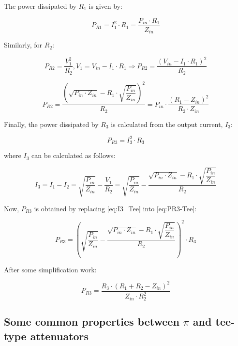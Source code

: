 \noindent The power dissipated by $R_{1}$ is given by:

\begin{equation}
P_{R1} = I_{1}^2 \cdot R_{1} = \dfrac{P_{in} \cdot R_{1}}{Z_{in}}
\end{equation}

\noindent Similarly, for $R_{2}$:

\begin{equation}
P_{R2} = \dfrac{V_{1}^2}{R_{2}}, V_{1} = V_{in} - I_{1} \cdot R_{1} \Rightarrow P_{R2} = \dfrac{(V_{in} - I_{1}\cdot R_{1})^2}{R_{2}}
\end{equation}

\begin{equation}
P_{R2} = \dfrac{\left( \sqrt{P_{in} \cdot Z_{in}} - R_{1}\cdot \sqrt{\dfrac{P_{in}}{Z_{in}}}\right)^2}{R_2} = P_{in} \cdot \dfrac{(R_{1}-Z_{in})^2}{R_{2} \cdot Z_{in}}
\end{equation}

\noindent Finally, the power dissipated by $R_{3}$ is calculated from the output current, $I_3$:

\begin{equation}
P_{R3} = I_{3}^2 \cdot R_{3}
\label{eq:PR3-Tee}
\end{equation}

\noindent where $I_{3}$ can be calculated as follows:

\begin{equation}
I_3 = I_1 - I_2 = \sqrt{\dfrac{P_{in}}{Z_{in}}} - \dfrac{V_{1}}{R_{2}} = \sqrt{\dfrac{P_{in}}{Z_{in}}} - \dfrac{\sqrt{P_{in} \cdot Z_{in}} - R_{1} \cdot \sqrt{\dfrac{P_{in}}{Z_{in}}}}{R_{2}}
\label{eq:I3_Tee}
\end{equation}

\noindent Now, $P_{R3}$ is obtained by replacing \ref{eq:I3_Tee} into \ref{eq:PR3-Tee}:

\begin{equation}
P_{R3} = \left( \sqrt{\dfrac{P_{in}}{Z_{in}}} - \dfrac{\sqrt{P_{in} \cdot Z_{in}} - R_{1} \cdot \sqrt{\dfrac{P_{in}}{Z_{in}}}}{R_{2}} \right)^2 \cdot R_{3}
\end{equation}

\noindent After some simplification work:

\begin{equation}
P_{R3} = \dfrac{R_3 \cdot (R_1 + R_2 - Z_{in})^2}{Z_{in} \cdot R_{2}^2}
\end{equation}

\subsection{Some common properties between $\pi$ and tee-type attenuators}


